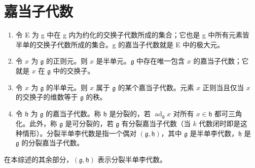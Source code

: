 \section*{嘉当子代数}

\begin{enumerate}
\def\labelenumi{\arabic{enumi})}
\item
  令 E 为 g 中在 g 内为约化的交换子代数所成的集合；它也是 g 中所有元素皆半单的交换子代数所成的集合。g 的嘉当子代数就是 E 中的极大元。
\item
  令 \(x\) 为 \(\mathfrak{g}\) 的正则元。则 \(x\) 是半单元。\(\mathfrak{g}\) 中存在唯一包含 \(x\) 的嘉当子代数；它就是 \(x\) 在 \(\mathfrak{g}\) 中的交换子。
\item
  令 \(x\) 为 \(\mathfrak{g}\) 的半单元。则 \(x\) 属于 \(\mathfrak{g}\) 的某个嘉当子代数。元素 \(x\) 正则当且仅当 \(x\) 的交换子的维数等于 \(\mathfrak{g}\) 的秩。
\item
  令 \(\mathfrak{h}\) 为 \(\mathfrak{g}\) 的嘉当子代数。称 \(\mathfrak{h}\) 是分裂的，若 \(\operatorname{ad}_{\mathfrak{g}}x\) 对所有 \(x \in \mathfrak{h}\) 都可三角化。此外，称 \(\mathfrak{g}\) 是可分裂的，若 \(\mathfrak{g}\) 有分裂嘉当子代数（当 \(k\) 代数闭时即是这种情形）。分裂半单李代数是指一个偶对 \((\mathfrak{g}, \mathfrak{h})\)，其中 \(\mathfrak{g}\) 是半单李代数，\(\mathfrak{h}\) 是 \(\mathfrak{g}\) 的分裂嘉当子代数。
\end{enumerate}

在本综述的其余部分，\((\mathfrak{g},\mathfrak{h})\) 表示分裂半单李代数。

